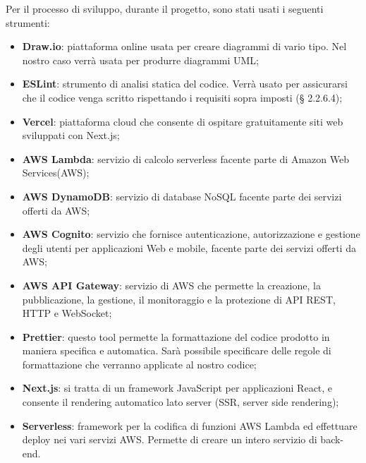 Per il processo di sviluppo, durante il progetto, sono stati usati i seguenti strumenti:
\begin{itemize}
\item \textbf{Draw.io}: piattaforma online usata per creare diagrammi di vario tipo. Nel nostro caso verrà usata per produrre diagrammi UML;
\item \textbf{ESLint}: strumento di analisi statica del codice. Verrà usato per assicurarsi che il codice venga scritto rispettando i requisiti sopra imposti (§ 2.2.6.4);
\item \textbf{Vercel}: piattaforma cloud che consente di ospitare gratuitamente siti web sviluppati con Next.js;
\item \textbf{AWS Lambda}: servizio di calcolo serverless facente parte di Amazon Web Services(AWS);
\item \textbf{AWS DynamoDB}: servizio di database NoSQL facente parte dei servizi offerti da AWS;
\item \textbf{AWS Cognito}: servizio che fornisce autenticazione, autorizzazione e gestione degli utenti per applicazioni Web e mobile, facente parte dei servizi offerti da AWS;
\item \textbf{AWS API Gateway}: servizio di AWS che permette la creazione, la pubblicazione, la gestione, il monitoraggio e la protezione di API REST, HTTP e WebSocket;
\item \textbf{Prettier}: questo tool permette la formattazione del codice prodotto in maniera specifica e automatica. Sarà possibile specificare delle regole di formattazione che verranno applicate al nostro codice;
\item \textbf{Next.js}: si tratta di un framework JavaScript per applicazioni React, e consente il rendering automatico lato server (SSR, server side rendering);
\item \textbf{Serverless}: framework per la codifica di funzioni AWS Lambda ed effettuare deploy nei vari servizi AWS. Permette di creare un intero servizio di back-end.
\end{itemize} 